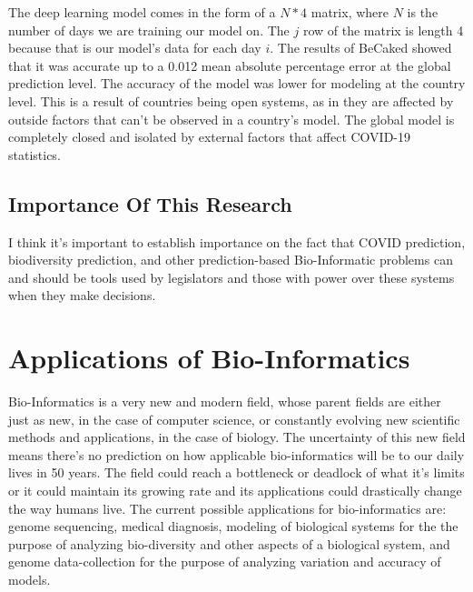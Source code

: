\documentclass[12pt,journal,compsoc]{IEEEtran}
\begin{document}
The deep learning model comes in the form of a $N * 4$ matrix, where $N$ is the number of days we are training our model on. The $j$ row of the matrix is length 4 because that is our model's data for each day $i$. The results of BeCaked showed that it was accurate up to a 0.012 mean absolute percentage error at the global prediction level. The accuracy of the model was lower for modeling at the country level. This is a result of countries being open systems, as in they are affected by outside factors that can't be observed in a country's model. The global model is completely closed and isolated by external factors that affect COVID-19 statistics.
\subsection{Importance Of This Research}
I think it's important to establish importance on the fact that COVID prediction, biodiversity prediction, and other prediction-based Bio-Informatic problems can and should be tools used by legislators and those with power over these systems when they make decisions.  

\section{Applications of Bio-Informatics}
Bio-Informatics is a very new and modern field, whose parent fields are either just as new, in the case of computer science, or constantly evolving new scientific methods and applications, in the case of biology. The uncertainty of this new field means there's no prediction on how applicable bio-informatics will be to our daily lives in 50 years. The field could reach a bottleneck or deadlock of what it's limits or it could maintain its growing rate and its applications could drastically change the way humans live. The current possible applications for bio-informatics are: genome sequencing, medical diagnosis, modeling of biological systems for the the purpose of analyzing bio-diversity and other aspects of a biological system, and genome data-collection for the purpose of analyzing variation and accuracy of models. 
\end{document}
